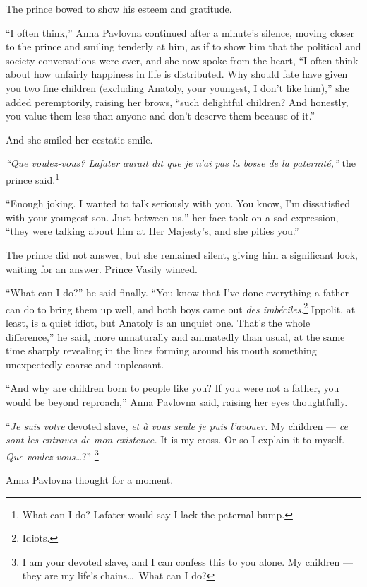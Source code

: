 The prince bowed to show his esteem and gratitude.

``I often think,'' Anna Pavlovna continued after a minute's silence,
moving closer to the prince and smiling tenderly at him, as if to show
him that the political and society conversations were over, and she
now spoke from the heart, ``I often think about how unfairly happiness
in life is distributed. Why should fate have given you two fine
children (excluding Anatoly, your youngest, I don't like him),'' she
added peremptorily, raising her brows, ``such delightful children? And
honestly, you value them less than anyone and don't deserve them
because of it.''

And she smiled her ecstatic smile.

\textit{``Que voulez-vous? Lafater aurait dit que je n'ai pas la bosse
  de la paternit\'e,''} the prince said.\footnote{What can I do?
  Lafater would say I lack the paternal bump.}

``Enough joking. I wanted to talk seriously with you. You know, I'm
dissatisfied with your youngest son. Just between us,'' her face took
on a sad expression, ``they were talking about him at Her Majesty's,
and she pities you.''

The prince did not answer, but she remained silent, giving him a
significant look, waiting for an answer. Prince Vasily winced.

``What can I do?'' he said finally. ``You know that I've done
everything a father can do to bring them up well, and both boys came
out \textit{des imb\'eciles}.\footnote{Idiots.} Ippolit, at least, is
a quiet idiot, but Anatoly is an unquiet one. That's the whole
difference,'' he said, more unnaturally and animatedly than usual, at
the same time sharply revealing in the lines forming around his mouth
something unexpectedly coarse and unpleasant.

``And why are children born to people like you? If you were not a
father, you would be beyond reproach,'' Anna Pavlovna said, raising
her eyes thoughtfully.

``\textit{Je suis votre} devoted slave, \textit{et \`a vous seule je
  puis l'avouer.} My children --- \textit{ce sont les entraves de mon
  existence.} It is my cross. Or so I explain it to
myself. \textit{Que voulez vous\ldots{}}?'' \footnote{I am your
  devoted slave, and I can confess this to you alone. My children ---
  they are my life's chains\ldots\ What can I do?}

Anna Pavlovna thought for a moment.

